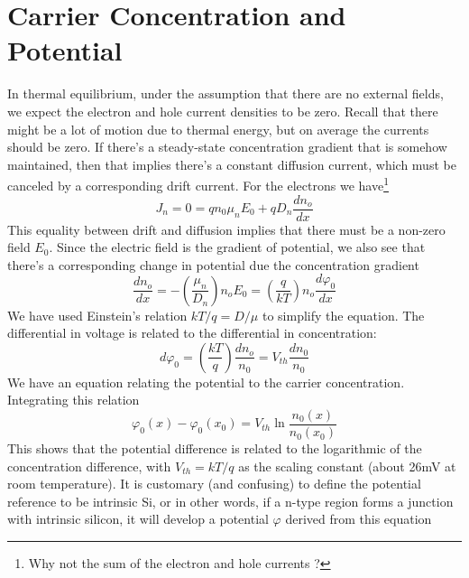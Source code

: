 \section{Carrier Concentration and Potential}
In thermal equilibrium, under the assumption that there are no external fields, we expect the electron and hole current densities to be zero.  Recall that there might be a lot of motion due to thermal energy, but on average the currents should be zero.  If there's a steady-state concentration gradient that is somehow maintained, then that implies there's a constant diffusion current, which must be canceled by a corresponding drift current.  For the electrons we have\footnote{Why not the sum of the electron and hole currents ?}
    \begin{equation}
        {J_n} = 0 = q{n_0}{\mu _n}{E_0} + q{D_n}\frac{{d{n_o}}}{{dx}} 
    \end{equation}
This equality between drift and diffusion implies that there must be a non-zero field $E_0$.  Since the electric field is the gradient of potential, we also see that there's a corresponding change in potential due the concentration gradient
    \begin{equation} 
        \frac{{d{n_o}}}{{dx}} =  - \left( {\frac{{{\mu _n}}}{{{D_n}}}} \right){n_o}{E_0} = \left( {\frac{q}{{kT}}} \right){n_o}\frac{{d{\varphi _0}}}{{dx}} 
    \end{equation}
We have used Einstein's relation $kT/q = D/\mu$ to simplify the equation.   The differential in voltage is related to the differential in concentration:
    \begin{equation} 
        d{\varphi _0} = \left( {\frac{{kT}}{q}} \right)\frac{{d{n_o}}}{{{n_0}}} = {V_{th}}\frac{{d{n_0}}}{{{n_0}}} 
    \end{equation}
We have an equation relating the potential to the carrier concentration.  Integrating this relation
    \begin{equation} {\varphi _0}(x) - {\varphi _0}({x_0}) = {V_{th}}\ln 
        \frac{{{n_0}(x)}}{{{n_0}({x_0})}}
    \end{equation}
This shows that the potential difference is related to the logarithmic  of the concentration difference, with $V_{th} = kT/q$ as the scaling constant (about 26mV at room temperature). 
It is customary (and confusing) to define the potential reference to be intrinsic Si, or in other words, if a n-type region forms a junction with intrinsic silicon, it will develop a potential $\varphi$ derived from this equation
